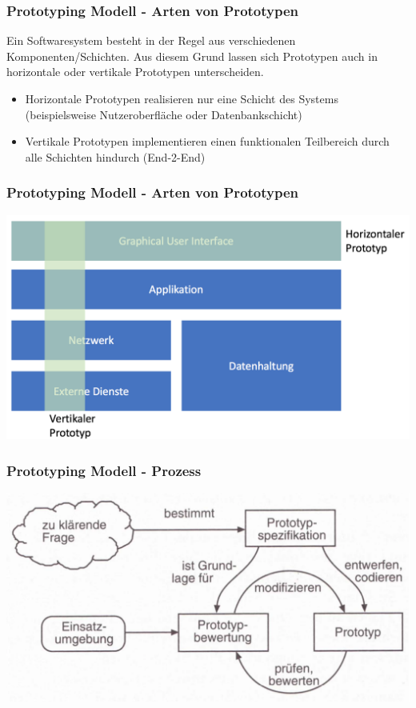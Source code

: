 \begin{frame}
\frametitle{Prototyping Modell - Arten von Prototypen}
	Ein Softwaresystem besteht in der Regel aus verschiedenen Komponenten/Schichten.
	Aus diesem Grund lassen sich Prototypen auch in horizontale oder vertikale 
	Prototypen unterscheiden.
	\begin{itemize}
		\item Horizontale Prototypen realisieren nur eine Schicht des Systems
		(beispielsweise Nutzeroberfläche oder Datenbankschicht)
		\item Vertikale Prototypen implementieren einen funktionalen Teilbereich 
		durch alle Schichten hindurch (End-2-End)
	\end{itemize}
\end{frame}

\begin{frame}
\frametitle{Prototyping Modell - Arten von Prototypen}
	\center\includegraphics[width=1\textwidth,
			keepaspectratio=true]{bilder/prototypen.png}
\end{frame}

\begin{frame}
\frametitle{Prototyping Modell - Prozess}
	\center\includegraphics[width=1\textwidth,
			keepaspectratio=true]{bilder/prototyp_entwicklung.png}
\end{frame}


